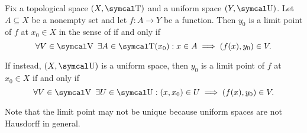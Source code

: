 \begin{proposition}\label{thm:uniform_space_local_convergence}
  Fix a topological space \( (X, \CT) \) and a uniform space \( (Y, \CU) \). Let \( A \subseteq X \) be a nonempty set and let \( f: A \to Y \) be a function. Then \( y_0 \) is a limit point of \( f \) at \( x_0 \in X \) in the sense of  if and only if
  \begin{equation}\label{thm:uniform_space_local_continuity/topological_source}
    \forall V \in \CV \ \exists A \in \CT(x_0) : x \in A \implies (f(x), y_0) \in V.
  \end{equation}

  If instead, \( (X, \CU) \) is a uniform space, then \( y_0 \) is a limit point of \( f \) at \( x_0 \in X \) if and only if
  \begin{equation}\label{thm:uniform_space_local_continuity/uniform_source}
    \forall V \in \CV \ \exists U \in \CU : (x, x_0) \in U \implies (f(x), y_0) \in V.
  \end{equation}

  Note that the limit point may not be unique because uniform spaces are not Hausdorff in general.
\end{proposition}
